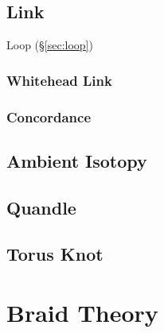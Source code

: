 \subsection{Link} \label{sec:link}

Loop (\S\ref{sec:loop})



\subsubsection{Whitehead Link} \label{sec:whitehead_link}

\subsubsection{Concordance} \label{sec:concordance}



\subsection{Ambient Isotopy} \label{sec:ambient_isotopy}

\subsection{Quandle} \label{sec:quandle}

\subsection{Torus Knot} \label{sec:torus_knot}



\section{Braid Theory} \label{sec:braid_theory}

